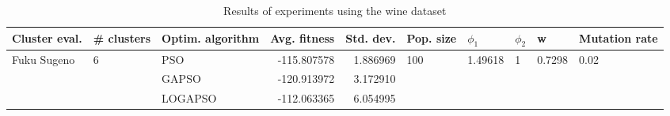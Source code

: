 \begin{table}
\centering
\caption{Results of experiments using the wine dataset}
\begin{tabular}{lllrrlllll}
\toprule
               Cluster eval. &        \# clusters & Optim. algorithm &  Avg. fitness &  Std. dev. &            Pop. size &               $\phi_{1}$ &         $\phi_{2}$ &                       w &         Mutation rate \\
\midrule
\multirow{3}{*}{Fuku Sugeno} & \multirow{3}{*}{6} &              PSO &   -115.807578 &   1.886969 & \multirow{3}{*}{100} & \multirow{3}{*}{1.49618} & \multirow{3}{*}{1} & \multirow{3}{*}{0.7298} & \multirow{3}{*}{0.02} \\
                             &                    &            GAPSO &   -120.913972 &   3.172910 &                      &                          &                    &                         &                       \\
                             &                    &          LOGAPSO &   -112.063365 &   6.054995 &                      &                          &                    &                         &                       \\
\bottomrule
\end{tabular}
\end{table}
